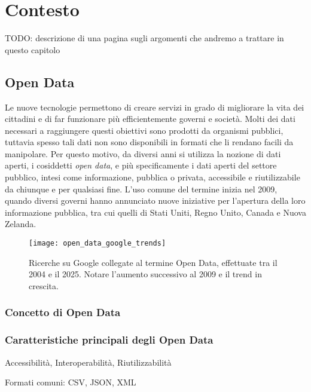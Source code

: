 \clearpage{\pagestyle{empty}\cleardoublepage}
\chapter{Contesto}
\lhead[\fancyplain{}{\bfseries\thepage}]{\fancyplain{}{\bfseries\rightmark}}

TODO: descrizione di una pagina sugli argomenti che andremo a trattare in questo capitolo \newpage

\section{Open Data} %
Le nuove tecnologie permettono di creare servizi in grado di migliorare la vita dei cittadini e di far funzionare più efficientemente governi e società. Molti dei dati necessari a raggiungere questi obiettivi sono prodotti da organismi pubblici, tuttavia spesso tali dati non sono disponibili in formati che li rendano facili da manipolare.
Per questo motivo, da diversi anni si utilizza la nozione di dati aperti, i cosiddetti \textit{open data}, e più specificamente i dati aperti del settore pubblico, intesi come informazione, pubblica o privata, accessibile e riutilizzabile da chiunque e per qualsiasi fine. L'uso comune del termine inizia nel 2009, quando diversi governi hanno annunciato nuove iniziative per l'apertura della loro informazione pubblica, tra cui quelli di Stati Uniti, Regno Unito, Canada e Nuova Zelanda.

\begin{figure}[H]
    \centering
    \texttt{[image: open\_data\_google\_trends]}
    \caption[Open Data su Google Trends]{Ricerche su Google collegate al termine Open Data, effettuate tra il 2004 e il 2025. Notare l'aumento successivo al 2009 e il trend in crescita.}
\end{figure}

\subsection{Concetto di Open Data}


\subsection{Caratteristiche principali degli Open Data}
Accessibilità, Interoperabilità, Riutilizzabilità

Formati comuni: CSV, JSON, XML

